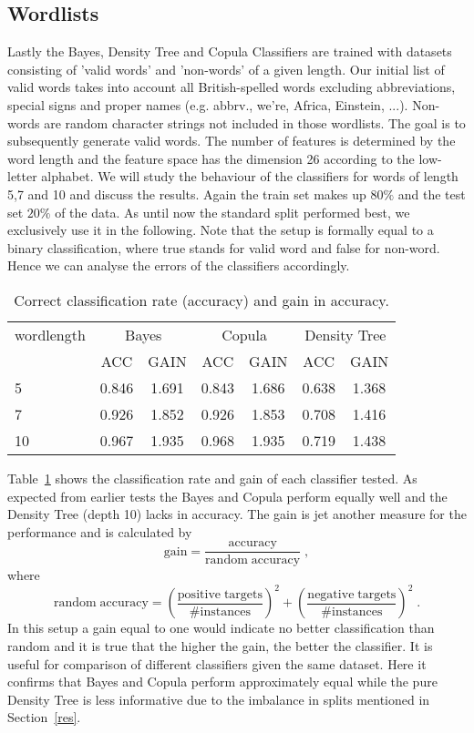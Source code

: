 \documentclass[draft]{article}
\begin{document}
\subsection{Wordlists}
Lastly the Bayes, Density Tree and Copula Classifiers are trained with datasets consisting of 'valid words' and 'non-words'
of a given length. Our initial list of valid words takes into account all British-spelled words
excluding abbreviations, special signs and proper names (e.g. abbrv., we're, Africa, Einstein, ...).
Non-words are random character strings not included in those wordlists.
The goal is to subsequently generate valid words.
\newline
The number of features is determined by the word length
and the feature space has the dimension 26 according to the low-letter alphabet.
We will study the behaviour of the classifiers for words of length 5,7 and 10 and discuss the results.
Again the train set makes up $80\%$ and the test set $20\%$ of the data.
As until now the standard split performed best, we exclusively use it in the following.
\newline
Note that the setup is formally equal to a binary classification,
where true stands for valid word and false for non-word.
Hence we can analyse the errors of the classifiers accordingly.

\begin{table}[h]
	\centering
	\begin{tabular}{l c c c c c c }
		wordlength	& \multicolumn{2}{c}{Bayes} & \multicolumn{2}{c}{Copula}	& \multicolumn{2}{c}{Density Tree} 	\\
					& ACC		& GAIN			& ACC			& GAIN			& ACC			& GAIN				\\
		5			&	0.846	&	1.691		&	0.843		& 1.686			& 0.638 		& 1.368				\\
	 	7			&   0.926	&	1.852		&	0.926		& 1.853			& 0.708			& 1.416				\\
		10 			& 	0.967	&	1.935		&	0.968		& 1.935			& 0.719			& 1.438				\\
	\end{tabular}
	\caption{Correct classification rate (accuracy) and gain in accuracy.}
	\label{tab7}
\end{table}

Table~\ref{tab7} shows the classification rate and gain of each classifier tested.
As expected from earlier tests the Bayes and Copula perform equally well and the Density Tree (depth 10) lacks in
accuracy. The gain is jet another measure for the performance and is calculated by
$$ \mathrm{gain} = \frac{\mathrm{accuracy}}{\mathrm{random\; accuracy}} \; ,$$
where
$$ \mathrm{random\; accuracy} = \left(\frac{\mathrm{positive\; targets}}{\mathrm{\# instances}}\right)^2 +
\left(\frac{\mathrm{negative\; targets}}{\mathrm{\# instances}}\right)^2 \; .$$
In this setup a gain equal to one would indicate no better classification than random and
it is true that the higher the gain, the better the classifier.
It is useful for comparison of different classifiers given the same dataset.
Here it confirms that Bayes and Copula perform approximately equal
while the pure Density Tree is less informative due to the imbalance in splits mentioned
in Section~\ref{res}.
\newline
\end{document}
